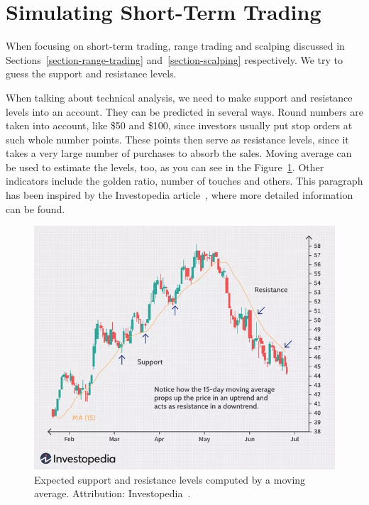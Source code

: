 \section{Simulating Short-Term Trading}
\label{section-testing-day-trading}
When focusing on short-term trading, range trading and scalping discussed in Sections~\ref{section-range-trading} and~\ref{section-scalping} respectively. We try to guess the support and resistance levels.

When talking about technical analysis, we need to make support and resistance levels into an account. They can be predicted in several ways. Round numbers are taken into account, like \$50 and \$100, since investors usually put stop orders at such whole number points. These points then serve as resistance levels, since it takes a very large number of purchases to absorb the sales. Moving average can be used to estimate the levels, too, as you can see in the Figure~\ref{figure-ma-support-resistance}. Other indicators include the golden ratio, number of touches and others. This paragraph has been inspired by the Investopedia article~\cite{investopedia:support-and-resistance}, where more detailed information can be found.

\begin{figure}[!t]
    \centering
    \includegraphics[width=\columnwidth]{figures/ma-support-resistance.png}
    \caption{Expected support and resistance levels computed by a moving average. Attribution: Investopedia~\cite{investopedia:support-and-resistance}.}
    \label{figure-ma-support-resistance}
\end{figure}

